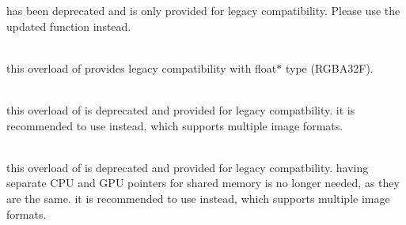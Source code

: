 \begin{DoxyRefList}
\label{deprecated__deprecated000021}%
%
 has been deprecated and is only provided for legacy compatibility. Please use the updated  function instead. 
\item[{\parbox[t]{\linewidth}{Member \doxylink{classimage_net_a1c645a989562b8bc8f1137f0f43fc6b7}{image\+Net::\+Classify} (float \texorpdfstring{$\ast$}{*}rgba, uint32\+\_\+t width, uint32\+\_\+t height, float \texorpdfstring{$\ast$}{*}confidence=NULL, \doxylink{group__image_format_ga931c48e08f361637d093355d64583406}{image\+Format} format=IMAGE\+\_\+\+RGBA32F)}}]\hfill \\
\label{deprecated__deprecated000006}%
%
this overload of  provides legacy compatibility with {\ttfamily float\texorpdfstring{$\ast$}{*}} type (RGBA32F).  
\item[{\parbox[t]{\linewidth}{Member \doxylink{group__image_ga6e2a8dafbe55bf80c3f82a67f27434dd}{load\+Image\+RGBA} (const char \texorpdfstring{$\ast$}{*}filename, float4 \texorpdfstring{$\ast$}{*}\texorpdfstring{$\ast$}{*}ptr, int \texorpdfstring{$\ast$}{*}width, int \texorpdfstring{$\ast$}{*}height, cuda\+Stream\+\_\+t stream=0)}}]\hfill \\
\label{deprecated__deprecated000016}%
%
this overload of  is deprecated and provided for legacy compatbility. it is recommended to use  instead, which supports multiple image formats.


\item[{\parbox[t]{\linewidth}{Member \doxylink{group__image_ga84d292def151b0d9f3cb1e32b0dcdcb7}{load\+Image\+RGBA} (const char \texorpdfstring{$\ast$}{*}filename, float4 \texorpdfstring{$\ast$}{*}\texorpdfstring{$\ast$}{*}cpu, float4 \texorpdfstring{$\ast$}{*}\texorpdfstring{$\ast$}{*}gpu, int \texorpdfstring{$\ast$}{*}width, int \texorpdfstring{$\ast$}{*}height, cuda\+Stream\+\_\+t stream=0)}}]\hfill \\
\label{deprecated__deprecated000017}%
%
this overload of  is deprecated and provided for legacy compatbility. having separate CPU and GPU pointers for shared memory is no longer needed, as they are the same. it is recommended to use  instead, which supports multiple image formats.



\end{DoxyRefList}
